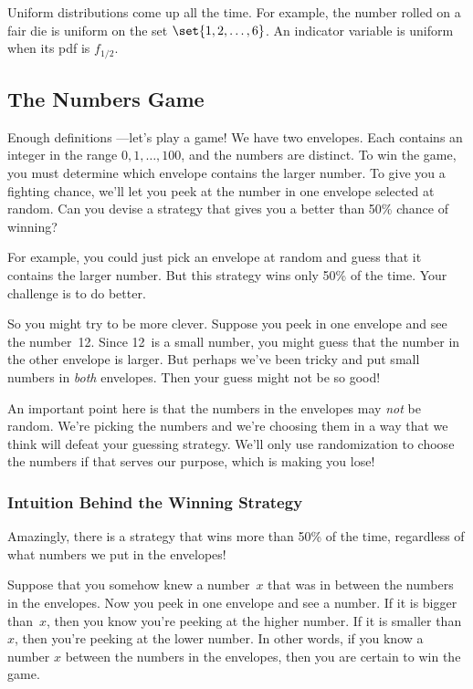 Uniform distributions come up all the time.  For example, the number
rolled on a fair die is uniform on the set $\set{1, 2, \dots, 6}$.  An
indicator variable is uniform when its pdf is $f_{1/2}$.

\subsection{The Numbers Game}\label{bigger_number_subsec}

Enough definitions ---let's play a game!  We have two envelopes.  Each
contains an integer in the range $0, 1, \dots, 100$, and the numbers
are distinct.  To win the game, you must determine which envelope
contains the larger number.  To give you a fighting chance, we'll let
you peek at the number in one envelope selected at random.  Can you
devise a strategy that gives you a better than 50\% chance of winning?

For example, you could just pick an envelope at random and guess that
it contains the larger number.  But this strategy wins only 50\% of
the time.  Your challenge is to do better.

So you might try to be more clever.  Suppose you peek in one envelope
and see the number~12.  Since 12~is a small number, you might guess
that the number in the other envelope is larger.  But perhaps we've
been tricky and put small numbers in \textit{both} envelopes.  Then
your guess might not be so good!

An important point here is that the numbers in the envelopes may
\emph{not} be random.  We're picking the numbers and we're choosing
them in a way that we think will defeat your guessing strategy.  We'll
only use randomization to choose the numbers if that serves our
purpose, which is making you lose!

\subsubsection{Intuition Behind the Winning Strategy}

Amazingly, there is a strategy that wins more than 50\% of the time,
regardless of what numbers we put in the envelopes!

Suppose that you somehow knew a number~$x$ that was in between the
numbers in the envelopes.  Now you peek in one envelope and see a
number.  If it is bigger than~$x$, then you know you're peeking at the
higher number.  If it is smaller than $x$, then you're peeking at the
lower number.  In other words, if you know a number $x$ between the
numbers in the envelopes, then you are certain to win the game.

